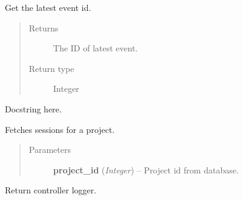 \documentclass[letterpaper,10pt,english]{sphinxmanual}
\begin{document}

\begin{fulllineitems}
\label{controller:controller.session.get_latest_event}
Get the latest event id.
\begin{quote}\begin{description}
\item[{Returns}] \leavevmode
The ID of latest event.

\item[{Return type}] \leavevmode
Integer

\end{description}\end{quote}

\end{fulllineitems}


\begin{fulllineitems}
\label{controller:controller.session.get_session_id_by_activity}
Docstring here.

\end{fulllineitems}


\begin{fulllineitems}
\label{controller:controller.session.get_sessions_by_project}
Fetches sessions for a project.
\begin{quote}\begin{description}
\item[{Parameters}] \leavevmode
\textbf{project\_id} (\emph{Integer}) -- Project id from database.

\end{description}\end{quote}

\end{fulllineitems}


\begin{fulllineitems}
\label{controller:controller.session.logger}
Return controller logger.

\end{fulllineitems}
\end{document}
